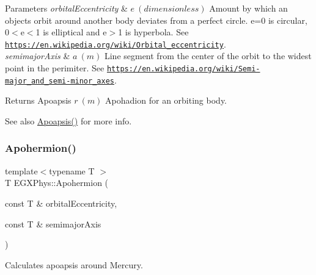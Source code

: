 \begin{DoxyParams}{Parameters}
{\em orbital\+Eccentricity} & $ e\ (dimensionless)$ Amount by which an objects orbit around another body deviates from a perfect circle. e=0 is circular, 0$<$e$<$1 is elliptical and e$>$1 is hyperbola. See \href{https://en.wikipedia.org/wiki/Orbital_eccentricity}{\tt https\+://en.\+wikipedia.\+org/wiki/\+Orbital\+\_\+eccentricity}. \\
\hline
{\em semimajor\+Axis} & $ a\ (m)$ Line segment from the center of the orbit to the widest point in the perimiter. See \href{https://en.wikipedia.org/wiki/Semi-major_and_semi-minor_axes}{\tt https\+://en.\+wikipedia.\+org/wiki/\+Semi-\/major\+\_\+and\+\_\+semi-\/minor\+\_\+axes}. \\
\hline
\end{DoxyParams}
\begin{DoxyReturn}{Returns}
Apoapsis $ r\ (m)$ Apohadion for an orbiting body. 
\end{DoxyReturn}
\begin{DoxySeeAlso}{See also}
\mbox{\hyperlink{group___e_g_x_phys-_apoapsis_gaf962e650bf84a568458e8eb39b1c61ba}{Apoapsis()}} for more info. 
\end{DoxySeeAlso}
\mbox{\label{group___e_g_x_phys-_apoapsis_gab002349e578241b3514f2212da9a7d48}} 
\subsubsection{\texorpdfstring{Apohermion()}{Apohermion()}}
{\footnotesize\ttfamily template$<$typename T $>$ \\
T E\+G\+X\+Phys\+::\+Apohermion (\begin{DoxyParamCaption}\item[{const T \&}]{orbital\+Eccentricity,  }\item[{const T \&}]{semimajor\+Axis }\end{DoxyParamCaption})}



Calculates apoapsis around Mercury. 



